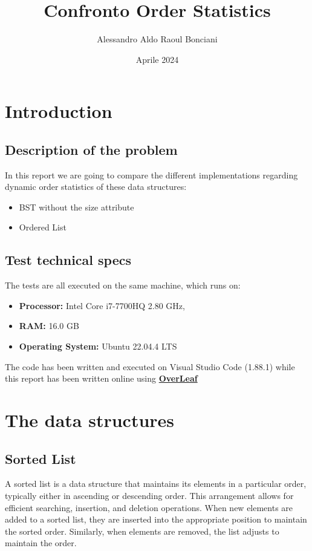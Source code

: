 \documentclass[11pt]{article}
\title{Confronto Order Statistics}
\author{Alessandro Aldo Raoul Bonciani}
\date{Aprile 2024}
\begin{document}

\maketitle
\tableofcontents


\newpage
\section{Introduction}
\subsection{Description of the problem}
In this report we are going to compare the different implementations regarding dynamic order statistics of these data structures:
\begin{itemize}
    \item BST without the size attribute
    \item Ordered List
\end{itemize}
\subsection{Test technical specs}
The tests are all executed on the same machine, which runs on:\begin{itemize}
    \item \textbf{Processor:} Intel Core i7-7700HQ 2.80 GHz,
    \item \textbf{RAM:} 16.0 GB
    \item \textbf{Operating System:} Ubuntu 22.04.4 LTS
\end{itemize}
The code has been written and executed on Visual Studio Code (1.88.1) while this report has been written online using \textbf{\href{https://overleaf.com}{OverLeaf}}
\section{The data structures}
\subsection{Sorted List}
A sorted list is a data structure that maintains its elements in a particular order, typically either in ascending or descending order. This arrangement allows for efficient searching, insertion, and deletion operations. When new elements are added to a sorted list, they are inserted into the appropriate position to maintain the sorted order. Similarly, when elements are removed, the list adjusts to maintain the order. 
\end{document}
